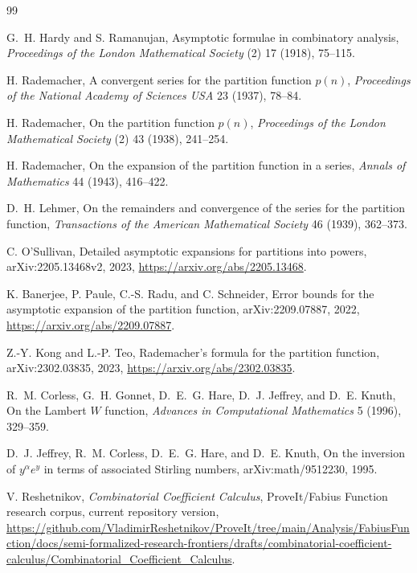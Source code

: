 \documentclass[11pt,a4paper]{article}
\numberwithin{equation}{section}
\theoremstyle{definition}
\theoremstyle{remark}
\begin{document}
\begingroup
\small
\setlength{\itemsep}{0.15em}
\begin{thebibliography}{99}

G.~H. Hardy and S. Ramanujan,
\newblock Asymptotic formulae in combinatory analysis,
\newblock \emph{Proceedings of the London Mathematical Society} (2) 17
(1918), 75--115.

H. Rademacher,
\newblock A convergent series for the partition function $p(n)$,
\newblock \emph{Proceedings of the National Academy of Sciences USA} 23
(1937), 78--84.

H. Rademacher,
\newblock On the partition function $p(n)$,
\newblock \emph{Proceedings of the London Mathematical Society} (2) 43
(1938), 241--254.

H. Rademacher,
\newblock On the expansion of the partition function in a series,
\newblock \emph{Annals of Mathematics} 44 (1943), 416--422.

D.~H. Lehmer,
\newblock On the remainders and convergence of the series for the partition
function,
\newblock \emph{Transactions of the American Mathematical Society} 46
(1939), 362--373.

C. O'Sullivan,
\newblock Detailed asymptotic expansions for partitions into powers,
\newblock arXiv:2205.13468v2, 2023,
\newblock \url{https://arxiv.org/abs/2205.13468}.

K. Banerjee, P. Paule, C.-S. Radu, and C. Schneider,
\newblock Error bounds for the asymptotic expansion of the partition function,
\newblock arXiv:2209.07887, 2022,
\newblock \url{https://arxiv.org/abs/2209.07887}.

Z.-Y. Kong and L.-P. Teo,
\newblock Rademacher's formula for the partition function,
\newblock arXiv:2302.03835, 2023,
\newblock \url{https://arxiv.org/abs/2302.03835}.

R.~M. Corless, G.~H. Gonnet, D.~E.~G. Hare, D.~J. Jeffrey, and D.~E. Knuth,
\newblock On the Lambert $W$ function,
\newblock \emph{Advances in Computational Mathematics} 5 (1996), 329--359.

D.~J. Jeffrey, R.~M. Corless, D.~E.~G. Hare, and D.~E. Knuth,
\newblock On the inversion of $y^\alpha e^y$ in terms of associated Stirling
numbers,
\newblock arXiv:math/9512230, 1995.

V. Reshetnikov,
\newblock \emph{Combinatorial Coefficient Calculus},
\newblock ProveIt/Fabius Function research corpus, current repository version,
\newblock \url{https://github.com/VladimirReshetnikov/ProveIt/tree/main/Analysis/FabiusFunction/docs/semi-formalized-research-frontiers/drafts/combinatorial-coefficient-calculus/Combinatorial_Coefficient_Calculus}.


\end{thebibliography}
\end{document}
